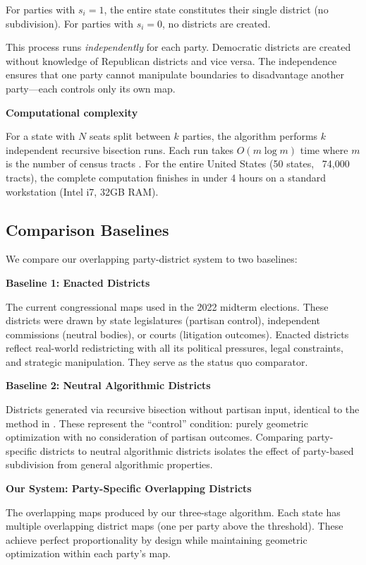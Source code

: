 For parties with $s_i = 1$, the entire state constitutes their single district (no subdivision). For parties with $s_i = 0$, no districts are created.

This process runs \emph{independently} for each party. Democratic districts are created without knowledge of Republican districts and vice versa. The independence ensures that one party cannot manipulate boundaries to disadvantage another party—each controls only its own map.

\textbf{Computational complexity}

For a state with $N$ seats split between $k$ parties, the algorithm performs $k$ independent recursive bisection runs. Each run takes $O(m \log m)$ time where $m$ is the number of census tracts \citep{karypis1998metis}. For the entire United States (50 states, ~74,000 tracts), the complete computation finishes in under 4 hours on a standard workstation (Intel i7, 32GB RAM).

\subsection{Comparison Baselines}

We compare our overlapping party-district system to two baselines:

\textbf{Baseline 1: Enacted Districts}

The current congressional maps used in the 2022 midterm elections. These districts were drawn by state legislatures (partisan control), independent commissions (neutral bodies), or courts (litigation outcomes). Enacted districts reflect real-world redistricting with all its political pressures, legal constraints, and strategic manipulation. They serve as the status quo comparator.

\textbf{Baseline 2: Neutral Algorithmic Districts}

Districts generated via recursive bisection without partisan input, identical to the method in \citet{author2024recursive}. These represent the ``control'' condition: purely geometric optimization with no consideration of partisan outcomes. Comparing party-specific districts to neutral algorithmic districts isolates the effect of party-based subdivision from general algorithmic properties.

\textbf{Our System: Party-Specific Overlapping Districts}

The overlapping maps produced by our three-stage algorithm. Each state has multiple overlapping district maps (one per party above the threshold). These achieve perfect proportionality by design while maintaining geometric optimization within each party's map.

